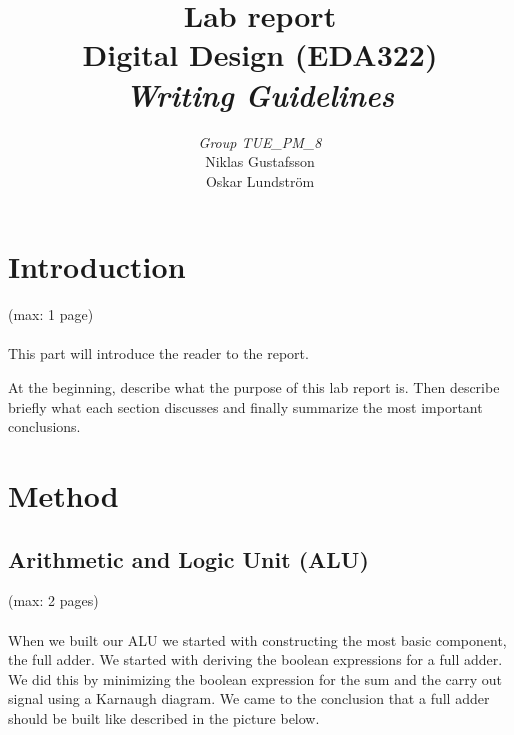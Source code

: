 \documentclass[a4paper,11pt]{article}
\begin{document}
\pagestyle{empty}
\begin{titlepage}

\title{\Huge{Lab report} \\[0.1cm] \Large{Digital Design (EDA322)} \\ [0.4cm] \Large{ \emph{Writing Guidelines}} \\[0.4cm]}
\author{\large{\emph{Group TUE\_PM\_8}} \\[0.2cm] Niklas Gustafsson \\[0.05cm] Oskar Lundström \\[0.1cm]}
\maketitle
\thispagestyle{empty}
\end{titlepage}
\clearpage
\pagestyle{fancyplain}
\tableofcontents
\clearpage
\setcounter{page}{1}
\section{Introduction}
(max: 1 page)
\\\\
This part will introduce the reader to the report. 

At the beginning, describe what the purpose of this lab report is. Then describe briefly what each section discusses and finally summarize the most important conclusions. 

\section{Method}
\subsection{Arithmetic and Logic Unit (ALU)}
(max: 2 pages)
\\\\

When we built our ALU we started with constructing the most basic component, the full adder. We started with deriving the boolean expressions for a full adder. We did this by minimizing the boolean expression for the sum and the carry out signal using a Karnaugh diagram. We came to the conclusion that a full adder should be built like described in the picture below. 
\end{document}
